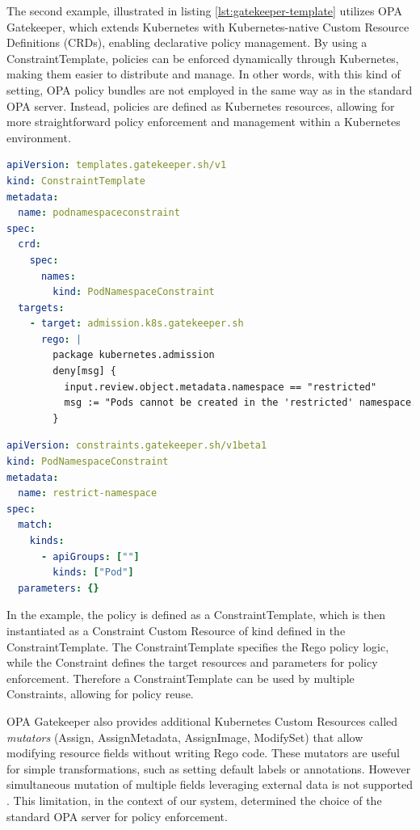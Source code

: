 The second example, illustrated in listing \ref{lst:gatekeeper-template} utilizes OPA Gatekeeper, which extends Kubernetes with Kubernetes-native Custom Resource Definitions (CRDs), enabling declarative policy management. By using a ConstraintTemplate, policies can be enforced dynamically through Kubernetes, making them easier to distribute and manage.
In other words, with this kind of setting, OPA policy bundles are not employed in the same way as in the standard OPA server. Instead, policies are defined as Kubernetes resources, allowing for more straightforward policy enforcement and management within a Kubernetes environment.

\begin{lstlisting}[language=yaml, caption={OPA Gatekeeper ConstraintTemplate}, label={lst:gatekeeper-template}]
apiVersion: templates.gatekeeper.sh/v1
kind: ConstraintTemplate
metadata:
  name: podnamespaceconstraint
spec:
  crd:
    spec:
      names:
        kind: PodNamespaceConstraint
  targets:
    - target: admission.k8s.gatekeeper.sh
      rego: |
        package kubernetes.admission
        deny[msg] {
          input.review.object.metadata.namespace == "restricted"
          msg := "Pods cannot be created in the 'restricted' namespace."
        }
\end{lstlisting}

\begin{lstlisting}[language=yaml, caption={OPA Gatekeeper Constraint}, label={lst:gatekeeper-constraint}, float=htpb]
apiVersion: constraints.gatekeeper.sh/v1beta1
kind: PodNamespaceConstraint
metadata:
  name: restrict-namespace
spec:
  match:
    kinds:
      - apiGroups: [""]
        kinds: ["Pod"]
  parameters: {}
\end{lstlisting}

In the example, the policy is defined as a ConstraintTemplate, which is then instantiated as a Constraint Custom Resource of kind defined in the ConstraintTemplate. The ConstraintTemplate specifies the Rego policy logic, while the Constraint defines the target resources and parameters for policy enforcement. Therefore a ConstraintTemplate can be used by multiple Constraints, allowing for policy reuse.

OPA Gatekeeper also provides additional Kubernetes Custom Resources called \textit{mutators} (Assign, AssignMetadata, AssignImage, ModifySet) that allow modifying resource fields without writing Rego code. These mutators are useful for simple transformations, such as setting default labels or annotations. However simultaneous mutation of multiple fields leveraging external data is not supported \cite{opa_gatekeeper_external_data}. This limitation, in the context of our system, determined the choice of the standard OPA server for policy enforcement.

